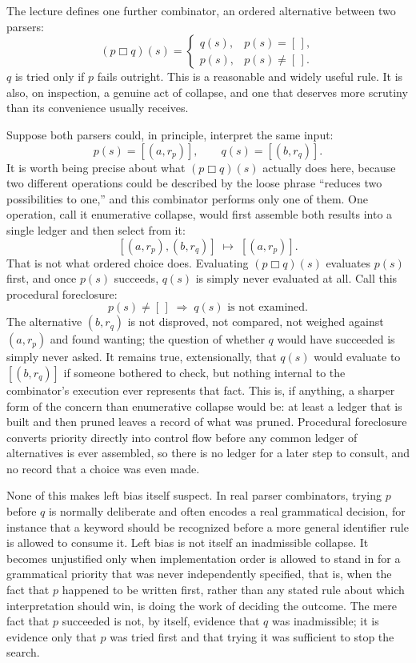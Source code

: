 \documentclass[11pt]{article}
\begin{document}
The lecture defines one further combinator, an ordered alternative between two parsers:
\[
(p \mathbin{\Box} q)(s) = \begin{cases} q(s), & p(s) = [\,], \\ p(s), & p(s) \neq [\,]. \end{cases}
\]
$q$ is tried only if $p$ fails outright. This is a reasonable and widely useful rule. It is also, on inspection, a genuine act of collapse, and one that deserves more scrutiny than its convenience usually receives.

Suppose both parsers could, in principle, interpret the same input:
\[
p(s) = [(a, r_p)], \qquad q(s) = [(b, r_q)].
\]
It is worth being precise about what $(p \mathbin{\Box} q)(s)$ actually does here, because two different operations could be described by the loose phrase ``reduces two possibilities to one,'' and this combinator performs only one of them. One operation, call it enumerative collapse, would first assemble both results into a single ledger and then select from it:
\[
[(a, r_p), (b, r_q)] \;\longmapsto\; [(a, r_p)].
\]
That is not what ordered choice does. Evaluating $(p \mathbin{\Box} q)(s)$ evaluates $p(s)$ first, and once $p(s)$ succeeds, $q(s)$ is simply never evaluated at all. Call this procedural foreclosure:
\[
p(s) \neq [\,] \;\Longrightarrow\; q(s) \text{ is not examined.}
\]
The alternative $(b, r_q)$ is not disproved, not compared, not weighed against $(a, r_p)$ and found wanting; the question of whether $q$ would have succeeded is simply never asked. It remains true, extensionally, that $q(s)$ would evaluate to $[(b, r_q)]$ if someone bothered to check, but nothing internal to the combinator's execution ever represents that fact. This is, if anything, a sharper form of the concern than enumerative collapse would be: at least a ledger that is built and then pruned leaves a record of what was pruned. Procedural foreclosure converts priority directly into control flow before any common ledger of alternatives is ever assembled, so there is no ledger for a later step to consult, and no record that a choice was even made.

None of this makes left bias itself suspect. In real parser combinators, trying $p$ before $q$ is normally deliberate and often encodes a real grammatical decision, for instance that a keyword should be recognized before a more general identifier rule is allowed to consume it. Left bias is not itself an inadmissible collapse. It becomes unjustified only when implementation order is allowed to stand in for a grammatical priority that was never independently specified, that is, when the fact that $p$ happened to be written first, rather than any stated rule about which interpretation should win, is doing the work of deciding the outcome. The mere fact that $p$ succeeded is not, by itself, evidence that $q$ was inadmissible; it is evidence only that $p$ was tried first and that trying it was sufficient to stop the search.
\end{document}
